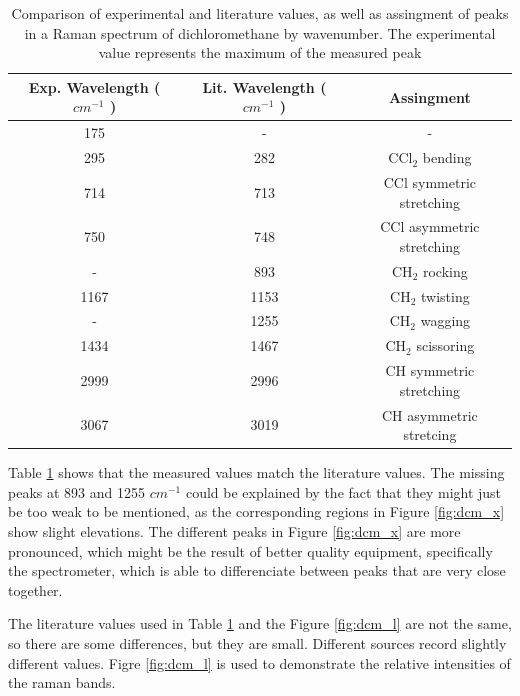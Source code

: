     \begin{table}[h]
    \begin{center}
        \vspace{10pt}
        \begin{tabular}{|c|c|c|}
         \hline
         Exp. Wavelength (\( cm^{-1} \) ) & Lit. Wavelength  (\( cm^{-1} \) ) & Assingment  \\ 
         \hline
         175 & - & - \\
         295 & 282 & CCl\(_2\) bending \\ 
         714 & 713 & CCl symmetric stretching\\
         750 & 748 & CCl asymmetric stretching\\
         - & 893 & CH\(_2\) rocking \\
         1167 & 1153 & CH\(_2\) twisting\\
         - & 1255 & CH\(_2\) wagging\\
         1434 & 1467 & CH\(_2\)  scissoring\\
         2999 & 2996 & CH symmetric stretching \\
         3067 & 3019 & CH asymmetric stretcing \\
         \hline
        \end{tabular}
        \caption{Comparison of experimental and literature \cite{dcml} values, as well as assingment of peaks in a Raman spectrum of dichloromethane by wavenumber. The experimental value represents the maximum of the measured peak }
        \label{table:dcm}
        \vspace{-15pt}
    \end{center}
    \end{table}

    Table \ref{table:dcm} shows that the measured values match the literature values. The missing peaks at 893 and 1255 \( cm^{-1}\) could be explained by the fact that they might just be too weak to be mentioned, as the corresponding regions in Figure \ref{fig:dcm_x} show slight elevations. The different peaks in Figure \ref{fig:dcm_x} are more pronounced, which might be the result of better quality equipment, specifically the spectrometer, which is able to differenciate between peaks that are very close together.

    \bigskip

    The literature values used in Table \ref{table:dcm} and the Figure \ref{fig:dcm_l} are not the same, so there are some differences, but they are small. Different sources record slightly different values. Figre \ref{fig:dcm_l} is used to demonstrate the relative intensities of the raman bands.

